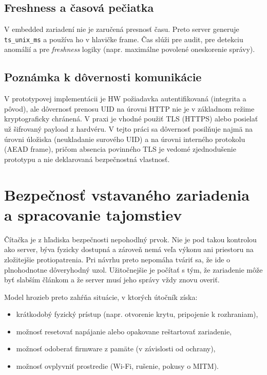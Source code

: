 \documentclass[journal,a4paper,onecolumn]{IEEEtran}
\begin{document}
\subsection{Freshness a časová pečiatka}

V embedded zariadení nie je zaručená presnosť času. Preto server generuje \texttt{ts\_unix\_ms} a používa ho v hlavičke frame. Čas slúži pre audit, pre detekciu anomálií a pre \emph{freshness} logiky (napr. maximálne povolené oneskorenie správy).

\subsection{Poznámka k dôvernosti komunikácie}

V prototypovej implementácii je HW požiadavka autentifikovaná (integrita a pôvod), ale dôvernosť prenosu UID na úrovni HTTP nie je v základnom režime kryptograficky chránená. V praxi je vhodné použiť TLS (HTTPS) alebo posielať už šifrovaný payload z hardvéru. V tejto práci sa dôvernosť posilňuje najmä na úrovni úložiska (neukladanie surového UID) a na úrovni interného protokolu (AEAD frame), pričom absencia povinného TLS je vedomé zjednodušenie prototypu a nie deklarovaná bezpečnostná vlastnosť.


\section{Bezpečnosť vstavaného zariadenia a spracovanie tajomstiev}

Čítačka je z hľadiska bezpečnosti nepohodlný prvok. Nie je pod takou kontrolou ako server, býva fyzicky dostupná a zároveň nemá veľa výkonu ani priestoru na zložitejšie protiopatrenia. Pri návrhu preto nepomáha tváriť sa, že ide o plnohodnotne dôveryhodný uzol. Užitočnejšie je počítať s tým, že zariadenie môže byť slabším článkom a že server musí jeho správy vždy znovu overiť.

Model hrozieb preto zahŕňa situácie, v ktorých útočník získa:

\begin{itemize}[leftmargin=*,itemsep=2pt]
  \item krátkodobý fyzický prístup (napr. otvorenie krytu, pripojenie k rozhraniam),
  \item možnosť resetovať napájanie alebo opakovane reštartovať zariadenie,
  \item možnosť odoberať firmware z pamäte (v závislosti od ochrany),
  \item možnosť ovplyvniť prostredie (Wi-Fi, rušenie, pokusy o MITM).
\end{itemize}
\end{document}

